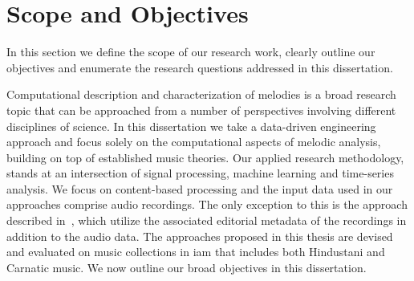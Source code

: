 %
%

\section{Scope and Objectives}
\label{sec:intro_scope_context_relevance}

In this section we define the scope of our research work, clearly outline our objectives and enumerate the research questions addressed in this dissertation. 

Computational description and characterization of melodies is a broad research topic that can be approached from a number of perspectives involving different disciplines of science. In this dissertation we take a data-driven engineering approach and focus solely on the computational aspects of melodic analysis, building on top of established music theories. Our applied research methodology, stands at an intersection of signal processing, machine learning and time-series analysis. We focus on content-based processing and the input data used in our approaches comprise audio recordings. The only exception to this is the approach described in~, which utilize the associated editorial metadata of the recordings in addition to the audio data. The approaches proposed in this thesis are devised and evaluated on music collections in \gls{iam} that includes both Hindustani and Carnatic music. We now outline our broad objectives in this dissertation.

